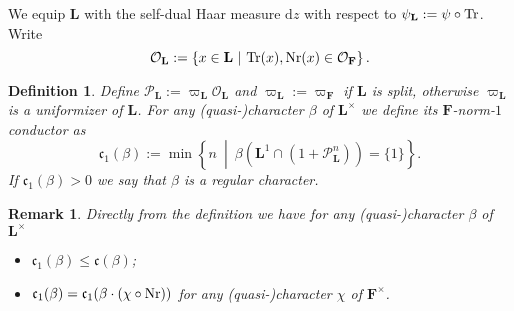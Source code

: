\documentclass[A4]{amsart}
\def\leq{\leqslant}
\newtheorem{definition} [theorem] {Definition}
\newtheorem{remark} [theorem] {Remark}
\numberwithin{equation}{section} \everymath{\displaystyle}
\newcommand{\Nr}{{\rm Nr}}
\newcommand{\Tr}{{\rm Tr}}
\newcommand{\ud}{\mathrm{d}}
\newcommand{\F}{\mathbf{F}}
\newcommand{\bL}{\mathbf{L}}
\newcommand{\vO}{\mathcal{O}}
\newcommand{\vP}{\mathcal{P}}
\newcommand{\cond}{\mathfrak{c}}
\begin{document}
\noindent We equip $\bL$ with the self-dual Haar measure $\ud z$ with respect to $\psi_{\bL} := \psi \circ \Tr$. Write 
	$$ \vO_{\bL} := \left\{ x \in \bL \ \middle| \ \Tr(x), \Nr(x) \in \vO_{\F} \right\}. $$
\begin{definition}
	Define $\vP_{\bL} := \varpi_{\bL} \vO_{\bL}$ and $\varpi_{\bL} := \varpi_{\F}$ if $\bL$ is split, otherwise $\varpi_{\bL}$ is a uniformizer of $\bL$. For any (quasi-)character $\beta$ of $\bL^{\times}$ we define its \emph{$\F$-norm-$1$ conductor} as
	$$ \cond_1(\beta) := \min \left\{ n \ \middle| \ \beta \left( \bL^1 \cap (1+\vP_{\bL}^n) \right) = \{ 1 \} \right\}. $$
	If $\cond_1(\beta) > 0$ we say that $\beta$ is a \emph{regular} character.
\end{definition}
\begin{remark}
	Directly from the definition we have for any (quasi-)character $\beta$ of $\bL^{\times}$
\begin{itemize}
	\item $\cond_1(\beta) \leq \cond(\beta)$;
	\item $\cond_1(\beta) = \cond_1(\beta \cdot (\chi \circ \Nr))$ for any (quasi-)character $\chi$ of $\F^{\times}$.
\end{itemize}
\end{remark}
	
\end{document}

